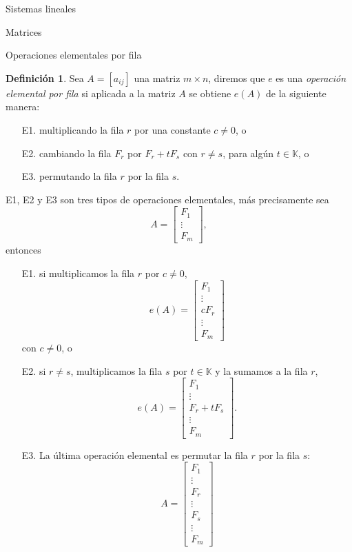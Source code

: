 \documentclass[a4paper,12pt,twoside,spanish,reqno]{amsbook}
\theoremstyle{definition}
\newtheorem{definicion}{Definici\'on}[section]
\theoremstyle{remark}
\newcommand{\K}{\mathbb K}
\begin{document}
\begin{chapter}{Sistemas lineales}
\begin{section}{Matrices}
\begin{subsection}{Operaciones elementales por fila}
				\begin{definicion}
					Sea $A = [a_{ij}]$ una matriz $m \times  n$, diremos que $e$ es una  \textit{operación elemental por fila} si aplicada a la matriz $A$ se obtiene  $e(A)$ de la siguiente manera:
					\begin{enumerate}
						\item[E1.]\label{elem-1} multiplicando la fila $r$ por una constante $c\not=0$, o
						\item[E2.]\label{elem-2} cambiando la fila $F_r$ por $F_r + tF_s$ con $r\not=s$, para algún $t \in \K$, o
						\item[E3.]\label{elem-3} permutando la fila $r$ por la fila $s$.   
					\end{enumerate}
					E1, E2 y E3 son tres tipos de operaciones elementales, más precisamente sea 
					\begin{equation*}
					A = \begin{bmatrix} 
					F_1 \\  \vdots \\	F_m
					\end{bmatrix},
					\end{equation*} entonces 
					\begin{enumerate}
						\item[E1.] si multiplicamos la fila $r$ por $c \not=0$, 
						$$ e(A) = \begin{bmatrix} 
						F_1 \\ 	\vdots \\ cF_r \\ \vdots \\	F_m
						\end{bmatrix} $$ con $c \not=0$, o
						\item[E2.] si $r\not=s$, multiplicamos la fila $s$ por  $t \in \K$ y la sumamos a la fila $r$, 
						$$ e(A)= \begin{bmatrix} 
						F_1 \\  \vdots \\ F_r + t F_s\\ \vdots \\	F_m
						\end{bmatrix}.$$
						\item[E3.] La última operación elemental es  permutar la fila $r$ por la fila $s$:
						$$
						A= \begin{bmatrix} 
						F_1 \\ 	\vdots \\ F_r \\ \vdots \\ F_s\\ \vdots \\	F_m

\end{bmatrix}$$
\end{enumerate}
\end{definicion}
\end{subsection}
\end{section}
\end{chapter}
\end{document}
